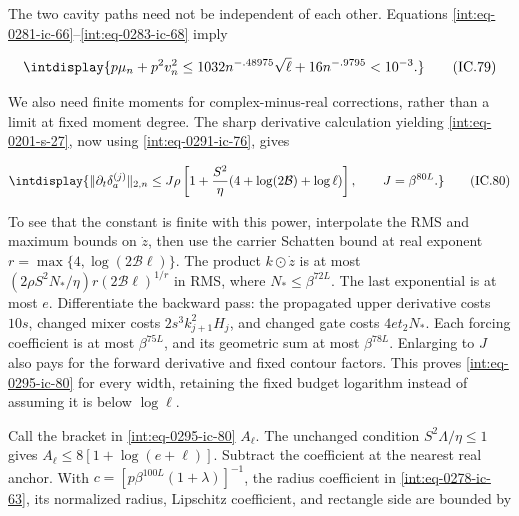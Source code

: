 
The two cavity paths need not be independent of each other. Equations \eqref{int:eq-0281-ic-66}--\allowbreak \eqref{int:eq-0283-ic-68} imply


\begingroup\renewcommand{\theHequation}{intdisplay.675}
\begin{equation}
\intdisplay{
p\mu_n+p^2v_n^2
 \le1032n^{-.48975}\sqrt\ell+16n^{-.9795}<10^{-3}.
}
\tag{IC.79}
\label{int:eq-0294-ic-79}
\end{equation}
\endgroup


We also need finite moments for complex-minus-real corrections, rather than a limit at fixed moment degree. The sharp derivative calculation yielding \eqref{int:eq-0201-s-27}, now using \eqref{int:eq-0291-ic-76}, gives


\begingroup\renewcommand{\theHequation}{intdisplay.676}
\begin{equation}
\intdisplay{
\|\partial_t\delta_a^{(j)}\|_{2,n}
 \le J\rho\left[1+\frac{S^2}{\eta}
                       (4+\log(2\mathcal B)+\log\ell)\right],
 \qquad J=\beta^{80L}.
}
\tag{IC.80}
\label{int:eq-0295-ic-80}
\end{equation}
\endgroup


To see that the constant is finite with this power, interpolate the RMS and maximum bounds on \(\dot z\), then use the carrier Schatten bound at real exponent \(r=\max\{4,\allowbreak \log(2\mathcal B\ell)\}\). The product \(k\odot\dot z\) is at most \((2\rho S^2N_*/\eta)r(2\mathcal B\ell)^{1/r}\) in RMS, where \(N_*\le\beta^{72L}\). The last exponential is at most \(e\). Differentiate the backward pass: the propagated upper derivative costs \(10s\), changed mixer costs \(2s^3k_{j+1}^2H_j\), and changed gate costs \(4et_2N_*\). Each forcing coefficient is at most \(\beta^{75L}\), and its geometric sum at most \(\beta^{78L}\). Enlarging to \(J\) also pays for the forward derivative and fixed contour factors. This proves \eqref{int:eq-0295-ic-80} for every width, retaining the fixed budget logarithm instead of assuming it is below \(\log\ell\).



Call the bracket in \eqref{int:eq-0295-ic-80} \(A_\ell\). The unchanged condition \(S^2\Lambda/\eta\le1\) gives \(A_\ell\le8[1+\log(e+\ell)]\). Subtract the coefficient at the nearest real anchor. With \(c=[p\beta^{100L}(1+\lambda)]^{-1}\), the radius coefficient in \eqref{int:eq-0278-ic-63}, its normalized radius, Lipschitz coefficient, and rectangle side are bounded by


